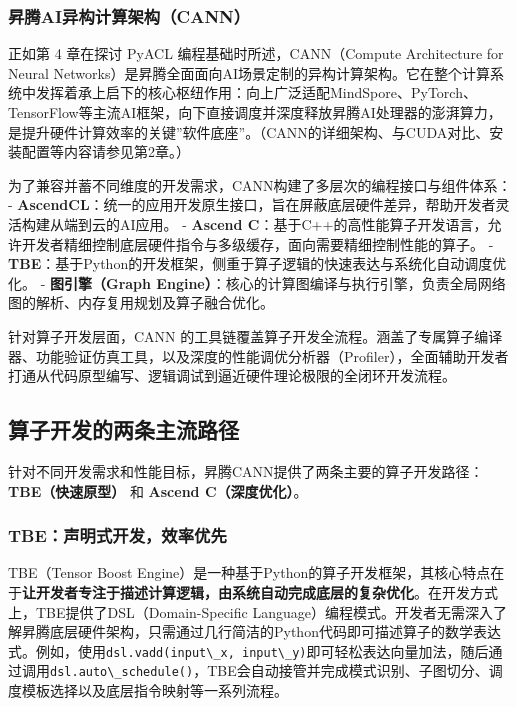 \subsubsection{昇腾AI异构计算架构（CANN）}\label{src-book-chapter7-h5}

正如第 4 章在探讨 PyACL 编程基础时所述，CANN（Compute Architecture for
Neural
Networks）是昇腾全面面向AI场景定制的异构计算架构。它在整个计算系统中发挥着承上启下的核心枢纽作用：向上广泛适配MindSpore、PyTorch、TensorFlow等主流AI框架，向下直接调度并深度释放昇腾AI处理器的澎湃算力，是提升硬件计算效率的关键''软件底座''。（CANN的详细架构、与CUDA对比、安装配置等内容请参见第2章。）

为了兼容并蓄不同维度的开发需求，CANN构建了多层次的编程接口与组件体系： -
\textbf{AscendCL}：统一的应用开发原生接口，旨在屏蔽底层硬件差异，帮助开发者灵活构建从端到云的AI应用。
- \textbf{Ascend
C}：基于C++的高性能算子开发语言，允许开发者精细控制底层硬件指令与多级缓存，面向需要精细控制性能的算子。
-
\textbf{TBE}：基于Python的开发框架，侧重于算子逻辑的快速表达与系统化自动调度优化。
- \textbf{图引擎（Graph
Engine）}：核心的计算图编译与执行引擎，负责全局网络图的解析、内存复用规划及算子融合优化。

针对算子开发层面，CANN
的工具链覆盖算子开发全流程。涵盖了专属算子编译器、功能验证仿真工具，以及深度的性能调优分析器（Profiler），全面辅助开发者打通从代码原型编写、逻辑调试到逼近硬件理论极限的全闭环开发流程。

\subsection{算子开发的两条主流路径}\label{src-book-chapter7-h6}

针对不同开发需求和性能目标，昇腾CANN提供了两条主要的算子开发路径：\textbf{TBE（快速原型）}
和 \textbf{Ascend C（深度优化）}。

\subsubsection{TBE：声明式开发，效率优先}\label{src-book-chapter7-h7}

TBE（Tensor Boost
Engine）是一种基于Python的算子开发框架，其核心特点在于\textbf{让开发者专注于描述计算逻辑，由系统自动完成底层的复杂优化}。在开发方式上，TBE提供了DSL（Domain-Specific
Language）编程模式。开发者无需深入了解昇腾底层硬件架构，只需通过几行简洁的Python代码即可描述算子的数学表达式。例如，使用\passthrough{\lstinline!dsl.vadd(input\_x, input\_y)!}即可轻松表达向量加法，随后通过调用\passthrough{\lstinline!dsl.auto\_schedule()!}，TBE会自动接管并完成模式识别、子图切分、调度模板选择以及底层指令映射等一系列流程。

